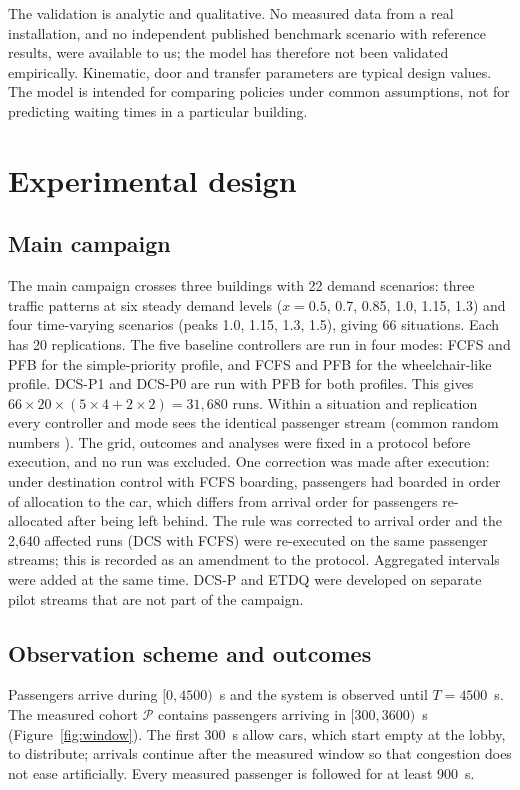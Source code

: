 \documentclass[12pt,a4paper]{article}
\begin{document}
The validation is analytic and qualitative. No measured data from a real installation, and no independent published benchmark scenario with reference results, were available to us; the model has therefore not been validated empirically. Kinematic, door and transfer parameters are typical design values. The model is intended for comparing policies under common assumptions, not for predicting waiting times in a particular building.

\section{Experimental design}\label{sec:design}

\subsection{Main campaign}
The main campaign crosses three buildings with 22 demand scenarios: three traffic patterns at six steady demand levels ($x=0.5$, 0.7, 0.85, 1.0, 1.15, 1.3) and four time-varying scenarios (peaks 1.0, 1.15, 1.3, 1.5), giving 66 situations. Each has 20 replications. The five baseline controllers are run in four modes: FCFS and PFB for the simple-priority profile, and FCFS and PFB for the wheelchair-like profile. DCS-P1 and DCS-P0 are run with PFB for both profiles. This gives $66\times20\times(5\times4+2\times2)=31{,}680$ runs. Within a situation and replication every controller and mode sees the identical passenger stream (common random numbers \cite{law2015}). The grid, outcomes and analyses were fixed in a protocol before execution, and no run was excluded. One correction was made after execution: under destination control with FCFS boarding, passengers had boarded in order of allocation to the car, which differs from arrival order for passengers re-allocated after being left behind. The rule was corrected to arrival order and the 2,640 affected runs (DCS with FCFS) were re-executed on the same passenger streams; this is recorded as an amendment to the protocol. Aggregated intervals were added at the same time. DCS-P and ETDQ were developed on separate pilot streams that are not part of the campaign.

\subsection{Observation scheme and outcomes}\label{sec:outcomes}
Passengers arrive during $[0,4500)$~s and the system is observed until $T=4500$~s. The measured cohort $\mathcal{P}$ contains passengers arriving in $[300,3600)$~s (Figure~\ref{fig:window}). The first 300~s allow cars, which start empty at the lobby, to distribute; arrivals continue after the measured window so that congestion does not ease artificially. Every measured passenger is followed for at least 900~s.
\end{document}
